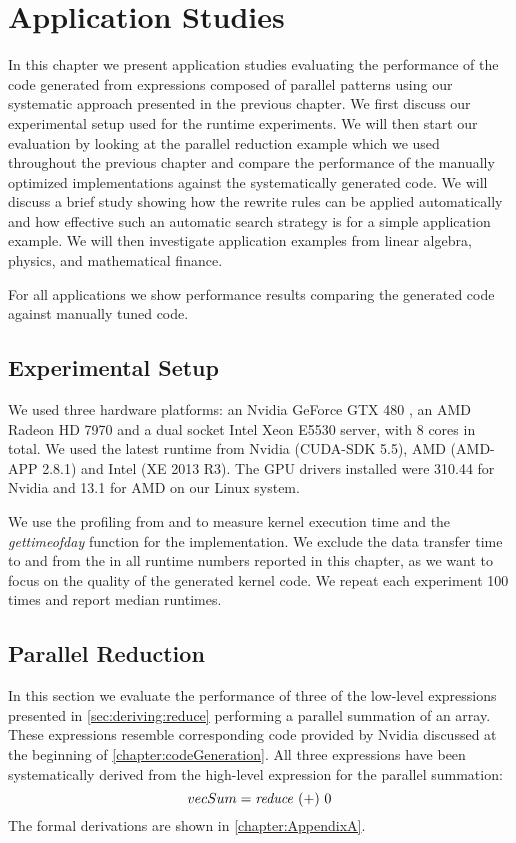 
\chapter{Application Studies}
\label{ch:sixth} %
\label{chapter:codeGeneration-evaluation}

In this chapter we present application studies evaluating the performance of the \OpenCL code generated from expressions composed of parallel patterns using our systematic approach presented in the previous chapter.
We first discuss our experimental setup used for the runtime experiments.
We will then start our evaluation by looking at the parallel reduction example which we used throughout the previous chapter and compare the performance of the manually optimized \OpenCL implementations against the systematically generated code.
We will discuss a brief study showing how the rewrite rules can be applied automatically and how effective such an automatic search strategy is for a simple application example.
We will then investigate application examples from linear algebra, physics, and mathematical finance.

For all applications we show performance results comparing the generated \OpenCL code against manually tuned \OpenCL code.

\section{Experimental Setup}
We used three hardware platforms: an Nvidia GeForce GTX 480 \GPU, an AMD Radeon HD 7970 \GPU and a dual socket Intel Xeon E5530 server, with 8 cores in total.
We used the latest \OpenCL runtime from Nvidia (CUDA-SDK 5.5), AMD (AMD-APP 2.8.1) and Intel (XE 2013 R3).
The GPU drivers installed were 310.44 for Nvidia and 13.1 for AMD on our Linux system.

We use the profiling \APIs from \OpenCL and \CUDA to measure kernel execution time and the \textit{gettimeofday} function for the \CPU implementation.
We exclude the data transfer time to and from the \GPU in all runtime numbers reported in this chapter, as we want to focus on the quality of the generated \OpenCL kernel code.
We repeat each experiment 100 times and report median runtimes.




\section{Parallel Reduction}
In this section we evaluate the performance of three of the low-level expressions presented in \autoref{sec:deriving:reduce} performing a parallel summation of an array.
These expressions resemble corresponding \OpenCL code provided by Nvidia discussed at the beginning of \autoref{chapter:codeGeneration}.
All three expressions have been systematically derived from the high-level expression for the parallel summation:
\begin{equation*}
  vecSum = \text{\textit{reduce}}\ (+)\ 0
\end{equation*}
The formal derivations are shown in \autoref{chapter:AppendixA}.

